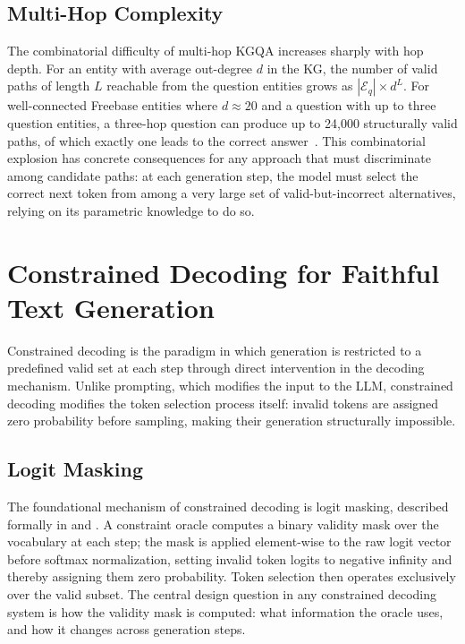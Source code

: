 \subsection{Multi-Hop Complexity}

The combinatorial difficulty of multi-hop KGQA increases sharply with hop depth. For an entity with average out-degree $d$ in the KG, the number of valid paths of length $L$ reachable from the question entities grows as $|\mathcal{E}_q| \times d^L$. For well-connected Freebase entities where $d \approx 20$ and a question with up to three question entities, a three-hop question can produce up to 24{,}000 structurally valid paths, of which exactly one leads to the correct answer~\citep{he2021multihop, lan2022kgqa}. This combinatorial explosion has concrete consequences for any approach that must discriminate among candidate paths: at each generation step, the model must select the correct next token from among a very large set of valid-but-incorrect alternatives, relying on its parametric knowledge to do so.

\section{Constrained Decoding for Faithful Text Generation}
\label{sec:constrained}

Constrained decoding is the paradigm in which generation is restricted to a predefined valid set at each step through direct intervention in the decoding mechanism. Unlike prompting, which modifies the input to the LLM, constrained decoding modifies the token selection process itself: invalid tokens are assigned zero probability before sampling, making their generation structurally impossible.

\subsection{Logit Masking}

The foundational mechanism of constrained decoding is logit masking, described formally in \citet{geng2023gcd} and \citet{willard2023outlines}. A constraint oracle computes a binary validity mask over the vocabulary at each step; the mask is applied element-wise to the raw logit vector before softmax normalization, setting invalid token logits to negative infinity and thereby assigning them zero probability. Token selection then operates exclusively over the valid subset. The central design question in any constrained decoding system is how the validity mask is computed: what information the oracle uses, and how it changes across generation steps.

